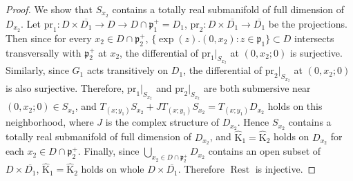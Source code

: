 \documentclass[11pt]{article}
\numberwithin{equation}{section}
\newcommand{\fp}{\mathfrak{p}}
\newcommand{\rK}{\mathrm{K}}
\newcommand{\Rest}{\operatorname{Rest}}
\begin{document}
\begin{proof}
We show that $S_{x_2}$ contains a totally real submanifold of full dimension of $D_{x_2}$.
Let $\mathrm{pr}_1\colon D\times\overline{D_1}\to D\to D\cap\fp^+_1=D_1$, $\mathrm{pr}_2\colon D\times\overline{D_1}\to \overline{D_1}$
be the projections. Then since for every $x_2\in D\cap\fp^+_2$, $\{\exp(z).(0,x_2)\colon z\in\fp_1\}\subset D$ intersects transversally
with $\fp^+_2$ at $x_2$, the differential of $\mathrm{pr}_1|_{S_{x_2}}$ at $(0,x_2;0)$ is surjective.
Similarly, since $G_1$ acts transitively on $D_1$, the differential of $\mathrm{pr}_2|_{S_{x_2}}$ at $(0,x_2;0)$ is also surjective.
Therefore, $\mathrm{pr}_1|_{S_{x_2}}$ and $\mathrm{pr}_2|_{S_{x_2}}$ are both submersive near $(0,x_2;0)\in S_{x_2}$,
and $T_{(x;y_1)}S_{x_2}+JT_{(x;y_1)}S_{x_2}=T_{(x;y_1)}D_{x_2}$ holds on this neighborhood,
where $J$ is the complex structure of $D_{x_2}$. Hence $S_{x_2}$ contains a totally real submanifold of full dimension of $D_{x_2}$,
and $\hat{\rK}_1=\hat{\rK}_2$ holds on $D_{x_2}$ for each $x_2\in D\cap\fp^+_2$.
Finally, since $\bigcup_{x_2\in D\cap\fp^+_2} D_{x_2}$ contains an open subset of $D\times\overline{D_1}$,
$\hat{\rK}_1=\hat{\rK}_2$ holds on whole $D\times\overline{D_1}$. Therefore $\Rest$ is injective.
\end{proof}
\end{document}
